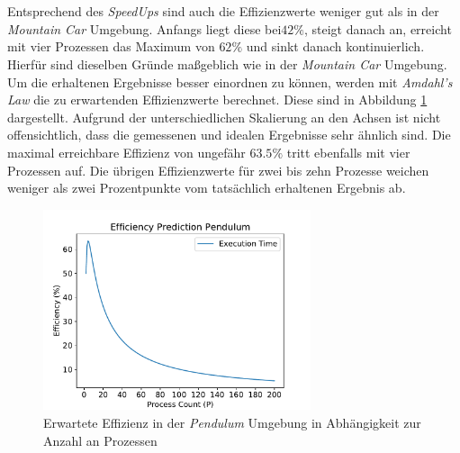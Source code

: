 \\\\
Entsprechend des \emph{SpeedUps} sind auch die Effizienzwerte weniger gut als in der \emph{Mountain Car} Umgebung. Anfangs liegt diese bei$42\%$, steigt danach an, erreicht mit vier Prozessen das Maximum von $62\%$ und sinkt danach kontinuierlich. Hierfür sind dieselben Gründe maßgeblich wie in der \emph{Mountain Car} Umgebung. Um die erhaltenen Ergebnisse besser einordnen zu können, werden mit \emph{Amdahl's Law} die zu erwartenden Effizienzwerte berechnet. Diese sind in Abbildung \ref{fig:pendulumr_efficiency_predidction} dargestellt. Aufgrund der unterschiedlichen Skalierung an den Achsen ist nicht offensichtlich, dass die gemessenen und idealen Ergebnisse sehr ähnlich sind. Die maximal erreichbare Effizienz von ungefähr $63.5\%$ tritt ebenfalls mit vier Prozessen auf. Die übrigen Effizienzwerte für zwei bis zehn Prozesse weichen weniger als zwei Prozentpunkte vom tatsächlich erhaltenen Ergebnis ab. 
\begin{figure}[!h]
	\centering
	\includegraphics[width=0.7\textwidth]{./img/pendulum_analysis/pendulum_efficiency_prediction.pdf} 
	\caption{Erwartete Effizienz in der \emph{Pendulum} Umgebung in Abhängigkeit zur Anzahl an Prozessen}
	\label{fig:pendulumr_efficiency_predidction}
\end{figure}

